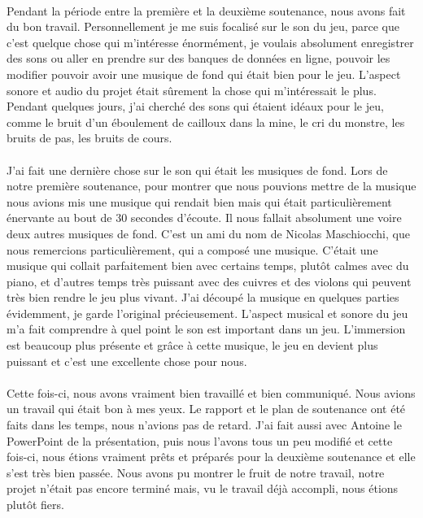 \documentclass[titlepage, 13px, a4paper]{report}
\begin{document}
\paragraph{} \hspace{0pt}
Pendant la période entre la première et la deuxième soutenance, 
nous avons fait du bon travail. Personnellement je me suis focalisé sur 
le son du jeu, parce que c’est quelque chose qui m’intéresse énormément, je voulais absolument enregistrer 
des sons ou aller en prendre sur des banques de données en ligne, pouvoir les modifier pouvoir avoir une 
musique de fond qui était bien pour le jeu. L’aspect sonore et audio du projet était sûrement 
la chose qui m’intéressait le plus. Pendant quelques jours, j’ai cherché des sons qui étaient idéaux pour le jeu, 
comme le bruit d’un éboulement de cailloux dans la mine, le cri du monstre, les bruits de pas, les bruits de cours. \\ \\
J’ai fait une dernière chose sur le son qui était les musiques de fond. 
Lors de notre première soutenance, pour montrer que nous pouvions mettre de la 
musique nous avions mis une musique qui rendait bien mais qui était particulièrement énervante au bout de 30 secondes 
d’écoute. Il nous fallait absolument une voire deux autres musiques de fond. C’est un ami du nom de 
Nicolas Maschiocchi, que nous remercions particulièrement, qui a composé une musique. C’était une musique 
qui collait parfaitement bien avec certains temps, plutôt calmes avec du piano, et d’autres temps très puissant 
avec des cuivres et des violons qui peuvent très bien rendre le jeu plus vivant. J’ai découpé la musique en 
quelques parties évidemment, je garde l’original précieusement. L’aspect musical et sonore du jeu m’a fait 
comprendre à quel point le son est important dans un jeu. L’immersion est beaucoup plus présente et grâce à 
cette musique, le jeu en devient plus puissant et c’est une excellente chose pour nous. \\ \\
Cette fois-ci, nous avons vraiment bien travaillé et bien communiqué. Nous avions un travail qui était bon à mes yeux. 
Le rapport et le plan de soutenance ont été faits dans les temps, nous n’avions pas de retard. J’ai fait aussi avec 
Antoine le PowerPoint de la présentation, puis nous l’avons tous un peu modifié et cette fois-ci, nous étions vraiment 
prêts et préparés pour la deuxième soutenance et elle s’est très bien passée. Nous avons pu montrer le fruit de notre 
travail, notre projet n’était pas encore terminé mais, vu le travail déjà accompli, nous étions plutôt fiers. \\
\end{document}
